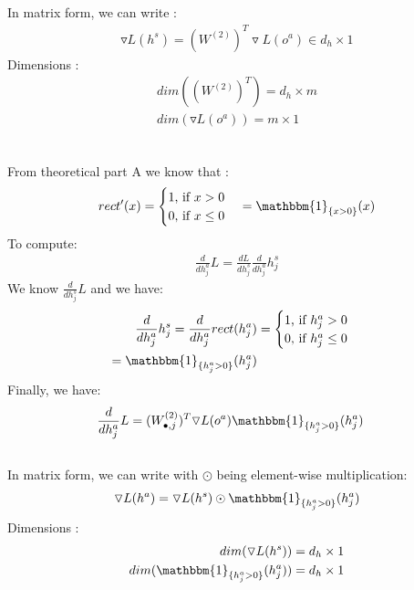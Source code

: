 \documentclass[12pt]{article}
\begin{document}
\subsection{}
In matrix form, we can write :
\begin{align*}
\triangledown L(h^s) =(W^{(2)})^T  \triangledown L(o^a) \in d_h \times 1
\end{align*}
Dimensions :
\begin{align*}
dim((W^{(2)})^T ) = d_h \times m \\
dim(\triangledown L(o^a)) = m \times 1 \\
\end{align*}
\subsection{}
From theoretical part A we know that :
\begin{align*}
rect'(x) = \begin{cases}
               1$, if $ x > 0 \\
               0$, if $ x \leq 0  \\
            \end{cases} = \mathbbm{1}_{\{x>0\}}(x)
\end{align*}
To compute: 
\begin{align*}
\frac{d}{dh^a_j} L =\frac{dL}{dh_j^s} \frac{d}{dh^a_j} h_j^s
\end{align*}
We know $\frac{d}{dh^s_j} L$ and we have:
\begin{align*}
\frac{d}{dh^a_j} {h^s_j} = \frac{d}{dh^a_j} {rect(h^a_j)} &=  \begin{cases}
               1$, if $ h^a_j > 0 \\
               0$, if $ h^a_j \leq 0  \\
            \end{cases}  \\ = \mathbbm{1}_{\{h^a_j>0\}}(h^a_j)
\end{align*}
Finally, we have:
\begin{align*}
\frac{d}{dh^a_j} L & = (W^{(2)}_{\bullet,j})^T \triangledown L(o^a)  \mathbbm{1}_{\{h^a_j>0\}}(h^a_j)
\end{align*}
\subsection{}
In matrix form, we can write with $\odot$ being element-wise multiplication:
\begin{align*}
\triangledown L(h^a) = \triangledown L(h^s) \odot \mathbbm{1}_{\{h^a_j>0\}}(h^a_j) 
\end{align*}
Dimensions :
\begin{align*}
dim(\triangledown L(h^s)) = d_h \times 1 \\
dim(\mathbbm{1}_{\{h^a_j>0\}}(h^a_j)) = d_h \times 1 \\
\end{align*}
\end{document}
